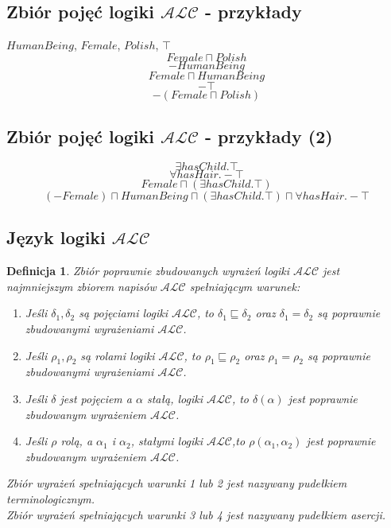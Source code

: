 \documentclass[12pt]{article}
\newtheorem{definicja}{Definicja}
\newcommand {\PZWWRP} {\ensuremath{\mathbb{PZW_{WRP}}}}
\begin{document}
\subsection{Zbiór pojęć logiki $\mathcal{ALC}$ - przykłady}
%
$HumanBeing$, $Female$, $Polish$, $\top$\\
%
$$Female \sqcap Polish$$
%
$$- HumanBeing$$
%
$$Female \sqcap HumanBeing$$
%
$$- \top$$
%
$$-(Female \sqcap Polish)$$
%

\subsection{Zbiór pojęć logiki $\mathcal{ALC}$ - przykłady (2)}
%
$$\exists hasChild . \top$$
%
$$\forall hasHair . - \top$$
%
$$Female \sqcap (\exists hasChild . \top)$$
%
$$(- Female) \sqcap HumanBeing \sqcap (\exists hasChild . \top) \sqcap \forall hasHair . - \top$$
%

\subsection{Język logiki $\mathcal{ALC}$}
%
\begin{definicja}
\label{PZWAL}
Zbiór poprawnie zbudowanych wyrażeń logiki $\mathcal{ALC}$ jest najmniejszym zbiorem napisów $\mathcal{ALC}$ spełniającym warunek:
%
\begin{enumerate}
\item Jeśli $\delta_{1}, \delta_{2}$ są pojęciami logiki $\mathcal{ALC}$, to $\delta_{1} \sqsubseteq \delta_{2}$ oraz $\delta_{1} = \delta_{2}$ są poprawnie zbudowanymi wyrażeniami $\mathcal{ALC}$.%
\item Jeśli $\rho_{1}, \rho_{2}$ są rolami logiki $\mathcal{ALC}$, to $\rho_{1} \sqsubseteq \rho_{2}$ oraz $\rho_{1} = \rho_{2}$ są poprawnie zbudowanymi wyrażeniami $\mathcal{ALC}$.%
\item Jeśli $\delta$ jest pojęciem a $\alpha$ stałą, logiki $\mathcal{ALC}$, to $\delta(\alpha)$ jest poprawnie zbudowanym wyrażeniem $\mathcal{ALC}$.%
\item Jeśli $\rho$ rolą, a $\alpha_{1}$ i $\alpha_{2}$, stałymi logiki $\mathcal{ALC}$,to $\rho(\alpha_{1}, \alpha_{2})$ jest poprawnie zbudowanym wyrażeniem $\mathcal{ALC}$.%
\end{enumerate}
Zbiór wyrażeń spełniających warunki 1 lub 2 jest nazywany pudełkiem terminologicznym.\\ %
Zbiór wyrażeń spełniających warunki 3 lub 4 jest nazywany pudełkiem asercji.
\end{definicja}
%
\end{document}
